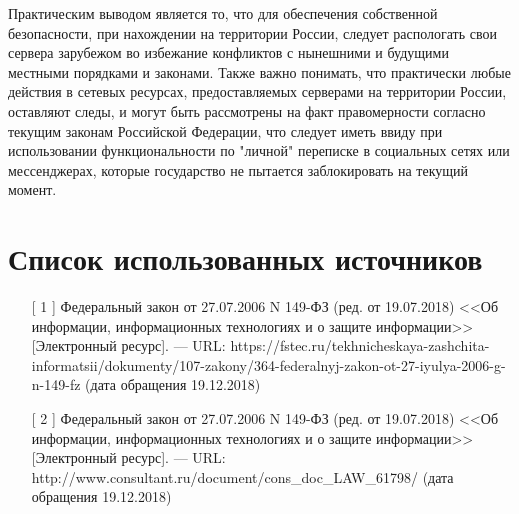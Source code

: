 Практическим выводом является то, что для обеспечения собственной безопасности, при нахождении на территории России, следует распологать свои сервера зарубежом во избежание конфликтов с нынешними и будущими местными порядками и законами. Также важно понимать, что практически любые действия в сетевых ресурсах, предоставляемых серверами на территории России, оставляют следы, и могут быть рассмотрены на факт правомерности согласно текущим законам Российской Федерации, что следует иметь ввиду при использовании функциональности по "личной" переписке в социальных сетях или мессенджерах, которые государство не пытается заблокировать на текущий момент.

\section{Список использованных источников}

\begin{enumerate}
	\item[[ 1]]  Федеральный закон от 27.07.2006 N 149-ФЗ (ред. от 19.07.2018) <<Об информации, информационных технологиях и о защите информации>> [Электронный ресурс]. — URL: https://fstec.ru/tekhnicheskaya-zashchita-informatsii/dokumenty/107-zakony/364-federalnyj-zakon-ot-27-iyulya-2006-g-n-149-fz (дата обращения 19.12.2018)
	\item[[ 2]]  Федеральный закон от 27.07.2006 N 149-ФЗ (ред. от 19.07.2018) <<Об информации, информационных технологиях и о защите информации>> [Электронный ресурс]. — URL: \\http://www.consultant.ru/document/cons\_doc\_LAW\_61798/ (дата обращения 19.12.2018)
\end{enumerate}


